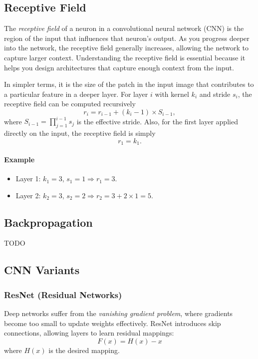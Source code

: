 \documentclass{article}
\begin{document}
\subsection{Receptive Field}

The \emph{receptive field} of a neuron in a convolutional neural network (CNN) is the region of the input that influences that neuron's output. As you progress deeper into the network, the receptive field generally increases, allowing the network to capture larger context. Understanding the receptive field is essential because it helps you design architectures that capture enough context from the input.

In simpler terms, it is the size of the patch in the input image that contributes to a particular feature in a deeper layer. For layer \(i\) with kernel \(k_i\) and stride \(s_i\), the receptive field can be computed recursively
\[
r_i = r_{i-1} + (k_i - 1) \times S_{i-1},
\]
where \(S_{i-1} = \prod_{j=1}^{i-1} s_j\) is the effective stride. Also, for the first layer applied directly on the input, the receptive field is simply
\[
r_1 = k_1.
\]

\paragraph{Example}
\begin{itemize}
    \item Layer 1: \(k_1 = 3\), \(s_1 = 1 \Rightarrow r_1 = 3\).
    \item Layer 2: \(k_2 = 3\), \(s_2 = 2 \Rightarrow r_2 = 3 + 2 \times 1 = 5\).
\end{itemize}

\subsection{Backpropagation}
TODO

\subsection{CNN Variants}

\subsubsection{ResNet (Residual Networks)}
Deep networks suffer from the \textit{vanishing gradient problem}, where gradients become too small to update weights effectively. ResNet introduces skip connections, allowing layers to learn residual mappings:
\[
F(x) = H(x) - x
\]
where $H(x)$ is the desired mapping.
\end{document}
